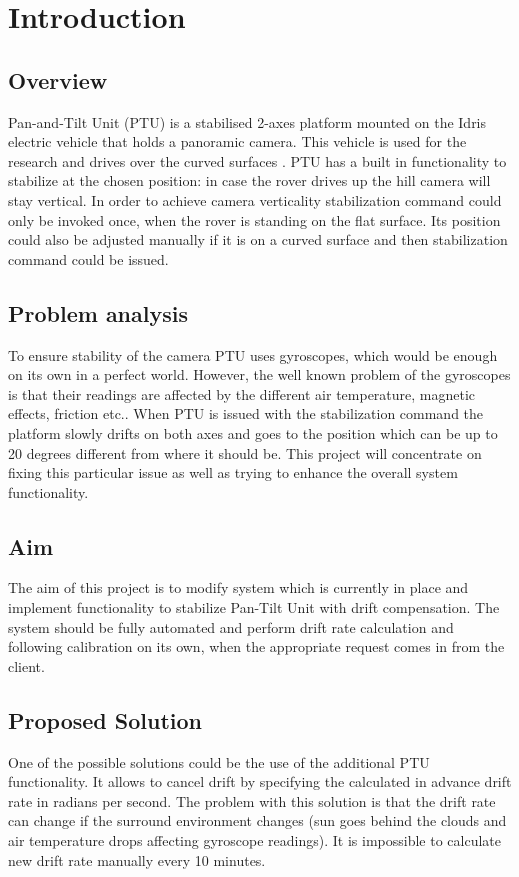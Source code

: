 \chapter{Introduction}

\section{Overview}
Pan-and-Tilt Unit (PTU) is a stabilised 2-axes platform mounted on the Idris electric vehicle that holds a panoramic camera. This vehicle is used for the research and drives over the curved surfaces \cite{ProjectIdris}. PTU has a built in functionality to stabilize at the chosen position: in case the rover drives up the hill camera will stay vertical. In order to achieve camera verticality stabilization command could only be invoked once, when the rover is standing on the flat surface. Its position could also be adjusted manually if it is on a curved surface and then stabilization command could be issued.

\section{Problem analysis}
To ensure stability of the camera PTU uses gyroscopes, which would be enough on its own in a perfect world. However, the well known problem of the gyroscopes is that their readings are affected by the different air temperature, magnetic effects, friction etc.\cite{HandbookOfModernSensors}. When PTU is issued with the stabilization command the platform slowly drifts on both axes and goes to the position which can be up to 20 degrees different from where it should be. This project will concentrate on fixing this particular issue as well as trying to enhance the overall system functionality. 

\section{Aim}
The aim of this project is to modify system which is currently in place and implement functionality to stabilize Pan-Tilt Unit with drift compensation. The system should be fully automated and perform drift rate calculation and following calibration on its own, when the appropriate request comes in from the client.

\section{Proposed Solution}
One of the possible solutions could be the use of the additional PTU functionality. It allows to cancel drift by specifying the calculated in advance drift rate in radians per second. The problem with this solution is that the drift rate can change if the surround environment changes (sun goes behind the clouds and air temperature drops affecting gyroscope readings). It is impossible to calculate new drift rate manually every 10 minutes.

